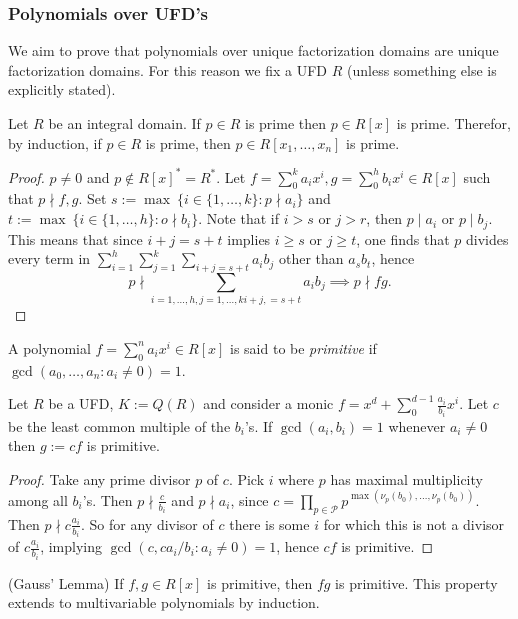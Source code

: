 \subsubsection{Polynomials over UFD's}
We aim to prove that polynomials over unique factorization domains are unique factorization domains. For this reason we fix a UFD $R$ (unless something else is explicitly stated). 
\begin{lemma}\label{PrimeInRingImpliesPrimePolynomialRing}
    Let $R$ be an integral domain. If $p\in R$ is prime then $p\in R[x]$ is prime. Therefor, by induction, if $p\in R$ is prime, then $p\in R[x_1,\dots,x_n]$ is prime.  
\end{lemma}
\begin{proof}
    $p\neq0$ and $p\notin R[x]^\ast = R^\ast$. Let $f=\sum_0^k a_ix^i,g=\sum_0^h b_ix^i\in R[x]$ such that $p\nmid f,g$. Set $s := \max\ \{i\in\{1,\dots,k\} : p\nmid a_i\}$ and $t:= \max\ \{i\in\{1,\dots,h\} : o\nmid b_i\}$. Note that if $i>s$ or $j>r$, then $p\mid a_i$ or $p\mid b_j$. This means that since $i+j = s+t$ implies $i\geq s$ or $j\geq t$, one finds that $p$ divides every term in $\sum_{i=1}^h\sum_{j=1}^k \sum_{i+j = s+t} a_ib_j$ other than $a_sb_t$, hence $$p\nmid \sum_{i=1,\dots,h,j=1,\dots,k i+j, = s+t} a_ib_j \implies p\nmid fg.$$  
\end{proof}
\begin{definition}
    A polynomial $f=\sum_0^n a_ix^i\in R[x]$ is said to be \textit{primitive} if $\gcd(a_0,\dots,a_n:a_i\neq 0)=1$.
\end{definition}
\begin{lemma}\label{CanConstructPrimitivePolynomialOverUFDFromMonicPolynomialOverQuotientField}
    Let $R$ be a UFD, $K:=Q(R)$ and consider a monic $f=x^d+\sum_0^{d-1} \frac{a_i}{b_i}x^i$. Let $c$ be the least common multiple of the $b_i$'s. If $\gcd(a_i,b_i)=1$ whenever $a_i\neq 0$ then $g:=cf$ is primitive. 
\end{lemma}
\begin{proof}
    Take any prime divisor $p$ of $c$. Pick $i$ where $p$ has maximal multiplicity among all $b_i$'s. Then $p\nmid \frac{c}{b_i}$ and $p\nmid a_i$, since $c= \prod_{p \in \mathcal{P}} p^{\max(\nu_{p}(b_0),\dots,\nu_p(b_0))}$. Then $p\nmid c\frac{a_i}{b_i}$. So for any divisor of $c$ there is some $i$ for which this is not a divisor of $c\frac{a_i}{b_i}$, implying $\gcd(c,ca_i/b_i: a_i\neq 0)=1$, hence $cf$ is primitive.
\end{proof}
\begin{lemma}\label{GaussLemma}(Gauss' Lemma)
    If $f,g\in R[x]$ is primitive, then $fg$ is primitive. This property extends to multivariable polynomials by induction.
\end{lemma}
